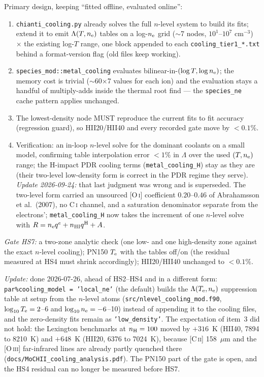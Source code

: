 \documentclass[english,a4paper]{my_memo}
\newcommand{\code}[1]{\texttt{#1}}
\newcommand{\Te}{T_{\rm e}}
\newcommand{\nelec}{n_{\rm e}}
\begin{document}
Primary design, keeping ``fitted offline, evaluated online'':

\begin{enumerate}[leftmargin=2em]
\item \code{chianti\_cooling.py} already solves the full $n$-level
  system to build its fits; extend it to emit
  $\Lambda(T,\nelec)$ tables on a log-$\nelec$ grid ($\sim$7 nodes,
  $10^1$--$10^7$ cm$^{-3}$) $\times$ the existing log-$T$ range, one
  block appended to each \code{cooling\_tier1\_*.txt} behind a
  format-version flag (old files keep working).
\item \code{species\_mod::metal\_cooling} evaluates
  bilinear-in-$(\log T,\log\nelec)$; the memory cost is trivial
  ($\sim$60$\times$7 values for each ion) and the evaluation stays a
  handful of multiply-adds inside the thermal root find --- the
  \code{species\_ne} cache pattern applies unchanged.
\item The lowest-density node MUST reproduce the current fits to fit
  accuracy (regression guard), so HII20/HII40 and every recorded gate
  move by $<0.1\%$.
\item Verification: an in-loop $n$-level solve for the dominant
  coolants on a small model, confirming table interpolation error
  $<1\%$ in $\Lambda$ over the used $(T,\nelec)$ range; the H-impact
  PDR cooling terms (\code{metal\_cooling\_H}) stay as they are (their
  two-level low-density form is correct in the PDR regime they serve).
  \emph{Update 2026-09-24:} that last judgment was wrong and is
  superseded.  The two-level form carried an unsourced [O\,\textsc{i}]
  coefficient $0.20$--$0.46$ of Abrahamsson et al.\ (2007), no
  C\,\textsc{i} channel, and a saturation denominator separate from the
  electrons'; \code{metal\_cooling\_H} now takes the increment of one
  $n$-level solve with $R = \nelec q^e + n_{\rm HI} q^{\rm H} + A$.
\end{enumerate}

\emph{Gate HS7:} a two-zone analytic check (one low- and one
high-density zone against the exact $n$-level cooling); PN150 $\Te$
with the tables off/on (the residual measured at HS4 must shrink
accordingly); HII20/HII40 unchanged to $<0.1\%$.

\emph{Update:} done 2026-07-26, ahead of HS2--HS4 and in a different form:
\code{par\%cooling\_model = 'local\_ne'} (the default) builds the
$\Lambda(\Te,\nelec)$ suppression table at setup from the $n$-level atoms
(\code{src/nlevel\_cooling\_mod.f90}, $\log_{10}\Te = 2$--6 and
$\log_{10}\nelec = -6$--10) instead of appending it to the cooling files, and
the zero-density fits remain as \code{'low\_density'}.  The expectation of
item~3 did not hold: the Lexington benchmarks at $n_{\rm H} = 100$ moved by
$+316$~K (HII40, 7894 to 8210~K) and $+648$~K (HII20, 6376 to 7024~K), because
[C\,\textsc{ii}] 158~$\mu$m and the [O\,\textsc{iii}] far-infrared lines are
already partly quenched there (\code{docs/MoCHII\_cooling\_analysis.pdf}).  The
PN150 part of the gate is open, and the HS4 residual can no longer be
measured before HS7.
\end{document}
